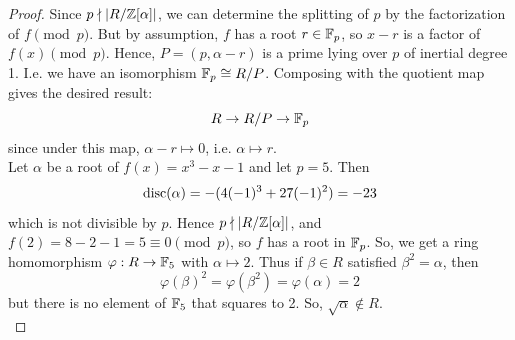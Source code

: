 \begin{proof}
	Since $p \nmid |R/\mathbb{Z}[\alpha]|$, we can determine the splitting of $p$ by the factorization of $f \pmod{p}$. But by assumption, $f$ has a root $r \in \mathbb{F}_p$, so $x-r$ is a factor of $f(x) \pmod{p}$. Hence, $P = (p,\alpha-r)$ is a prime lying over $p$ of inertial degree 1. I.e. we have an isomorphism $\mathbb{F}_p \cong R/P$. Composing with the quotient map gives the desired result:
	\[ R \to R/P \to \mathbb{F}_p \]
	since under this map, $\alpha-r \mapsto 0$, i.e. $\alpha \mapsto r$. \\
	
	Let $\alpha$ be a root of $f(x) = x^3-x-1$ and let $p=5$. Then
	\[ \operatorname{disc}(\alpha) = -(4(-1)^3+27(-1)^2) = -23 \]
	which is not divisible by $p$. Hence $p \nmid |R/\mathbb{Z}[\alpha]|$, and $f(2) = 8-2-1 = 5 \equiv 0 \pmod{p}$, so $f$ has a root in $\mathbb{F}_p$. So, we get a ring homomorphism $\varphi : R \to \mathbb{F}_5$ with $\alpha \mapsto 2$. Thus if $\beta \in R$ satisfied $\beta^2 = \alpha$, then
	\[ \varphi(\beta)^2 = \varphi(\beta^2) = \varphi(\alpha) = 2 \]
	but there is no element of $\mathbb{F}_5$ that squares to 2. So, $\sqrt{\alpha} \notin R$. \\
	
	
\end{proof}
